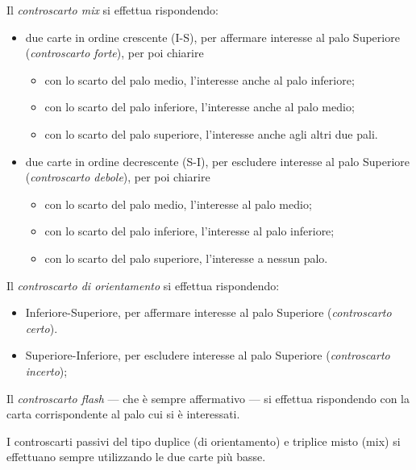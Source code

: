 \documentclass[italian,a4paper]{article}
\newenvironment{packeditem}{
\begin{itemize}
  \setlength{\itemsep}{1pt}
  \setlength{\parskip}{0pt}
  \setlength{\parsep}{0pt}
}{\end{itemize}}
\begin{document}
Il \emph{controscarto mix} si effettua rispondendo:
\begin{packeditem}
\item     due carte in ordine crescente (I-S), per affermare interesse al
    palo Superiore (\emph{controscarto forte}), per poi chiarire
\begin{packeditem}
\item       con lo scarto del palo medio, l'interesse anche al palo inferiore;
\item      con lo scarto del palo inferiore, l'interesse anche al palo medio;
\item       con lo scarto del palo superiore, l'interesse anche agli altri due pali.
\end{packeditem}
 
\item     due carte in ordine decrescente (S-I), per escludere
    interesse al palo Superiore (\emph{controscarto debole}), per poi chiarire
\begin{packeditem}
\item       con lo scarto del palo medio, l'interesse al palo medio;
\item      con lo scarto del palo inferiore, l'interesse al palo inferiore;
\item       con lo scarto del palo superiore, l'interesse a nessun palo.
\end{packeditem}
\end{packeditem}
 
Il \emph{controscarto di orientamento} si effettua rispondendo:
\begin{packeditem}
\item Inferiore-Superiore, per affermare interesse al palo Superiore
    (\emph{controscarto certo}).
\item Superiore-Inferiore, per escludere interesse al palo Superiore
    (\emph{controscarto incerto});
\end{packeditem}
 
Il \emph{controscarto flash} --- che è sempre affermativo --- si effettua rispondendo con la carta corrispondente al palo cui si è interessati.
 
I controscarti passivi del tipo duplice (di orientamento) e triplice misto (mix) si effettuano sempre utilizzando le due carte più basse.
 
\end{document}

